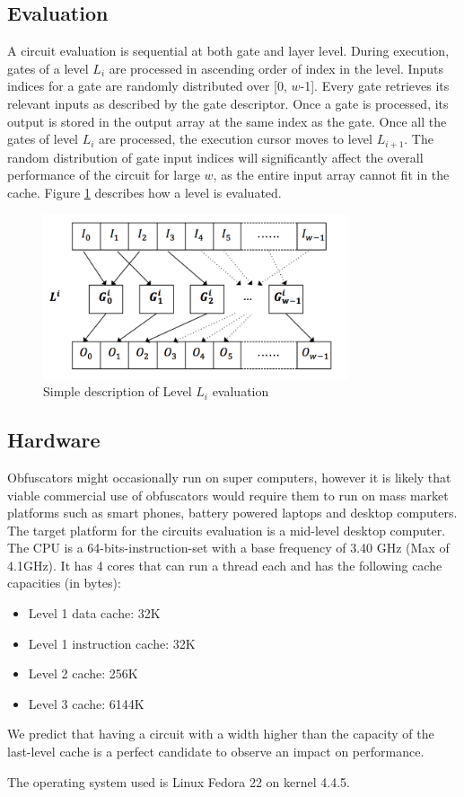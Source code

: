 \subsection{Evaluation}
A circuit evaluation is sequential at both gate and layer level. During execution, gates of a level $L_i$ are processed in ascending order of index in the level. Inputs indices for a gate are randomly distributed over [0, $w$-1]. Every gate retrieves its relevant inputs as described by the gate descriptor. Once a gate is processed, its output is stored in the output array at the same index as the gate. Once all the gates of level $L_i$ are processed, the execution cursor moves to level $L_{i+1}$. The random distribution of gate input indices will significantly affect the overall performance of the circuit for large $w$, as the entire input array cannot fit in the cache. Figure \ref{fig:level} describes how a level is evaluated.
\begin{figure}[h]
	\center
	\includegraphics[width=0.8\textwidth]{img/level.png}
	\caption{Simple description of Level $L_i$ evaluation}
	\label{fig:level}
\end{figure}
\par
\subsection{Hardware}
Obfuscators might occasionally run on super computers, however it is likely that viable commercial use of obfuscators would require them to run on mass market platforms such as smart phones, battery powered laptops and desktop computers\cite{clark}. The target platform for the circuits evaluation is a mid-level desktop computer. The CPU is a 64-bits-instruction-set 	 with a base frequency of 3.40 GHz (Max of 4.1GHz). It has 4 cores that can run a thread each and has the following cache capacities (in bytes): 
\begin{itemize}[noitemsep]
\item Level 1 data cache: 32K
\item Level 1 instruction cache: 32K
\item Level 2 cache: 256K
\item Level 3 cache: 6144K
\end{itemize}
We predict that having a circuit with a width higher than the capacity of the last-level cache is a perfect candidate to observe an impact on performance.
\par
The operating system used is Linux Fedora 22 on kernel 4.4.5.


